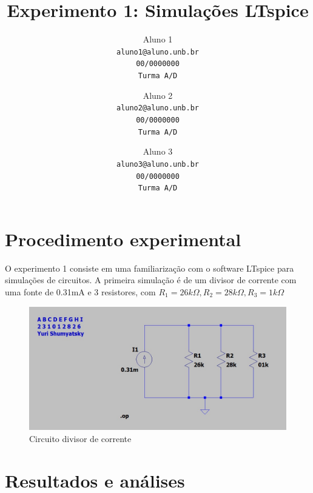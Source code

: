 \documentclass[10pt,twocolumn,letterpaper]{article}
\begin{document}
\title{Experimento 1: Simulações LTspice}

\author{Aluno 1\\
{\tt\small aluno1@aluno.unb.br}\\
{\tt\small 00/0000000}\\
{\tt\small Turma A/D}
\and
Aluno 2\\
{\tt\small aluno2@aluno.unb.br}\\
{\tt\small 00/0000000}\\
{\tt\small Turma A/D}
\and
Aluno 3\\
{\tt\small aluno3@aluno.unb.br}\\
{\tt\small 00/0000000}\\
{\tt\small Turma A/D}
}

\maketitle
\section{Procedimento experimental}

O experimento 1 consiste em uma familiarização com o software LTspice para simulações de circuitos. A primeira simulação é de um divisor de corrente com uma fonte de 0.31mA e 3 resistores, com $R_1 = 26k\Omega, R_2 = 28k\Omega, R_3 = 1k\Omega$

\begin{figure}[h]
\caption{Circuito divisor de corrente}
\includegraphics[scale=0.2]{figuras/fig1}
\end{figure}
\section{Resultados e análises}
\end{document}
